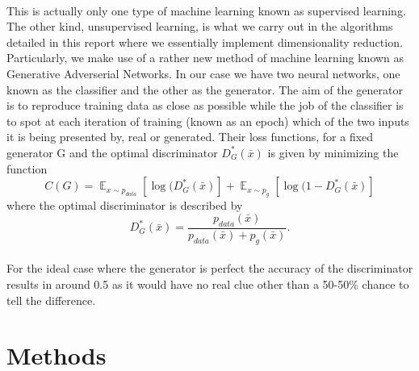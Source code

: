 \documentclass[11pt]{article} %
\DeclareMathOperator{\E}{\mathbb{E}}
\begin{document}
\\
\par This is actually only one type of machine learning known as supervised learning.
The other kind, unsupervised learning, is what we carry out in the algorithms detailed in this report where we essentially implement dimensionality reduction.
Particularly, we make use of a rather new method of machine learning known as Generative Adverserial Networks.
In our case we have two neural networks, one known as the classifier and the other as the generator.
The aim of the generator is to reproduce training data as close as possible while the job of the classifier is to
spot at each iteration of training (known as an epoch) which of the two inputs it is being presented by, real or generated.
Their loss functions, for a fixed generator G and the optimal discriminator $D^*_G(\bar x)$ is given by minimizing the function
\begin{equation}
  C(G)=\E_{x\sim p_{data}}[\log (D^*_G(\bar x)]+\E_{x\sim p_{g}}[\log(1-D^*_G(\bar x)]
  \label{eq:minmax}
\end{equation}
where the optimal discriminator is described by
\begin{equation}
  D^*_G(\bar x)= \frac{p_{data}(\bar x)}{p_{data}(\bar x) + p_{g}(\bar x)}.
  \label{eq:optimal_disc}
\end{equation}
\\
For the ideal case where the generator is perfect the accuracy of the discriminator results in around 0.5 as it would have no real clue other than a 50-50\% chance to tell the difference.
\section{Methods}
\end{document}
